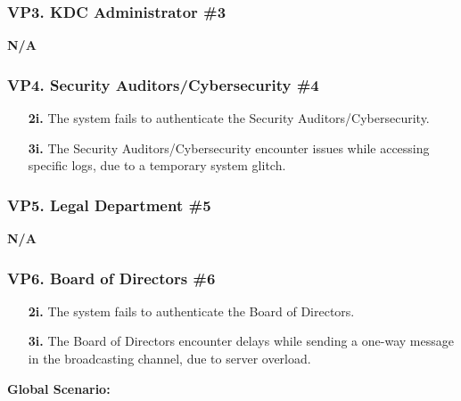 \documentclass[]{article}
\begin{document}
\subsubsection*{VP3. KDC Administrator \#3}
\textbf{N/A}
\subsubsection*{VP4. Security Auditors/Cybersecurity \#4}
\begin{enumerate}
	\item[\textbf{2i.}] The system fails to authenticate the Security Auditors/Cybersecurity.
	\item[\textbf{3i.}] The Security Auditors/Cybersecurity encounter issues while accessing specific logs, due to a temporary system glitch.
\end{enumerate}
\subsubsection*{VP5. Legal Department \#5}
\textbf{N/A}
\subsubsection*{VP6. Board of Directors \#6}
\begin{enumerate}
	\item[\textbf{2i.}] The system fails to authenticate the Board of Directors.
	\item[\textbf{3i.}] The Board of Directors encounter delays while sending a one-way message in the broadcasting channel, due to server overload.
\end{enumerate}
\textbf{Global Scenario:}
\end{document}
